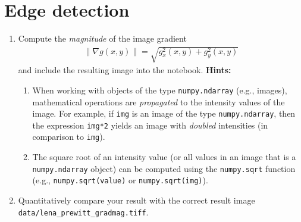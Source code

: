 \documentclass[12pt,a4paper]{article}
\begin{document}
\noindent\begin{minipage}{\textwidth}
\section{Edge detection}
\label{task:gradmag}
\begin{enumerate}
    \item Compute the \emph{magnitude} of the image gradient \begin{gather*}\left\|\nabla g\left(x,y\right)\right\| = \sqrt{g_x^2\left(x,y\right) + g_y^2\left(x,y\right)}\end{gather*} and include the resulting image into the notebook. \textbf{Hints:}
    \begin{enumerate}
        \item When working with objects of the type \texttt{numpy.ndarray} (e.g., images), mathematical operations are \emph{propagated} to the intensity values of the image. For example, if \texttt{img} is an image of the type \texttt{numpy.ndarray}, then the expression \texttt{img*2} yields an image with \emph{doubled} intensities (in comparison to \texttt{img}).
        \item The square root of an intensity value (or all values in an image that is a \texttt{numpy.ndarray} object) can be computed using the \texttt{numpy.sqrt} function (e.g., \texttt{numpy.sqrt(value)} or \texttt{numpy.sqrt(img)}).
    \end{enumerate}
    \item Quantitatively compare your result with the correct result image \texttt{data/\-lena\_\-prewitt\_\-gradmag.tiff}.
\end{enumerate}
\end{minipage}
\end{document}
